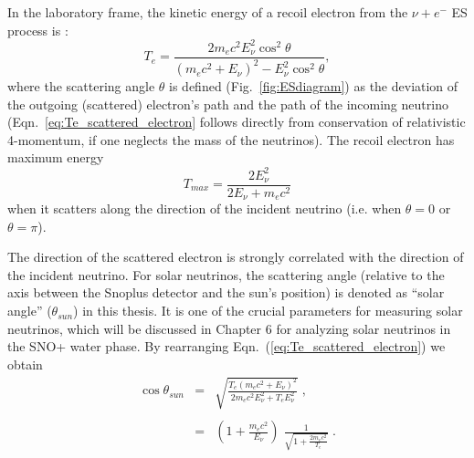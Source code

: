 In the laboratory frame, the kinetic energy of a recoil electron from the $\nu+e^-$ ES process is \cite{giunti2007fundamentals}:
\begin{equation}\label{eq:Te_scattered_electron}
T_e = \frac{2m_e c^2 E_\nu^2\cos^2\theta}{(m_e c^2 +E_\nu)^2-E_\nu^2\cos^2\theta},
\end{equation}
where the scattering angle $\theta$ is defined (Fig.~\ref{fig:ESdiagram}) as the deviation of the outgoing (scattered) electron's path and the path of the incoming neutrino (Eqn.~\ref{eq:Te_scattered_electron} follows directly from conservation of relativistic 4-momentum, if one neglects the mass of the neutrinos). The recoil electron has maximum energy 
\begin{equation}
T_{max}=\frac{2E^2_\nu}{2E_\nu+m_e c^2} 
\end{equation}
when it scatters along the direction of the incident neutrino (i.e. when $\theta=0$ or $\theta=\pi$).

The direction of the scattered electron is strongly correlated with the direction of the incident neutrino. For solar neutrinos, the scattering angle (relative to the axis between the Snoplus detector and the sun's position) is denoted as ``solar angle'' ($\theta_{sun}$) in this thesis. It is one of the crucial parameters for measuring solar neutrinos, which will be discussed in Chapter 6 for analyzing solar neutrinos in the SNO+ water phase. By rearranging Eqn.~(\ref{eq:Te_scattered_electron}) we obtain
\begin{eqnarray}\label{eq:costhetaSun}
\cos\theta_{sun} &=& \sqrt{\frac{T_e(m_e c^2 + E_\nu)^2}{2m_e c^2 E_\nu^2+T_eE_\nu^2}} \; , \nonumber \\
                 &\;& \\
                 &=& \left( 1 + \frac{m_e c^2}{E_{\nu}} \right) \; \frac{1}{\sqrt{1 + \frac{2 m_e c^2}{T_e}}} \; \nonumber.
\end{eqnarray}

